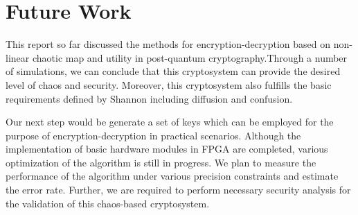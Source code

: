 \chapter{Future Work}
\label{chap:future}
\setlength{\parskip}{1.5mm}
This report so far discussed the methods for encryption-decryption based on non-linear chaotic map and utility in post-quantum cryptography.Through a number of simulations, we can conclude that this cryptosystem can provide the desired level of chaos and security. Moreover, this cryptosystem also fulfills the basic requirements defined by Shannon including diffusion and confusion.

Our next step would be generate a set of keys which can be employed for the purpose of encryption-decryption in practical scenarios. Although the implementation of basic hardware modules in FPGA are completed, various optimization of the algorithm is still in progress. We plan to measure the performance of the algorithm under various precision constraints and estimate the error rate. Further, we are required to perform necessary security analysis for the validation of this chaos-based cryptosystem.
